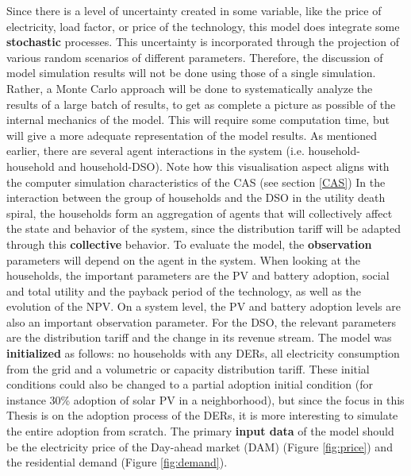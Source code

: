 \newline \newline \noindent
Since there is a level of uncertainty created in some variable, like the price of electricity, load factor, or price of the technology, this model does integrate some \textbf{stochastic} processes. This uncertainty is incorporated through the projection of various random scenarios of different parameters. Therefore, the discussion of model simulation results will not be done using those of a single simulation. Rather, a Monte Carlo approach will be done to systematically analyze the results of a large batch of results, to get as complete a picture as possible of the internal mechanics of the model. This will require some computation time, but will give a more adequate representation of the model results. As mentioned earlier, there are several agent interactions in the system (i.e. household-household and household-DSO). Note how this visualisation aspect aligns with the computer simulation characteristics of the CAS (see section \ref{CAS})
\newline \newline \noindent
In the interaction between the group of households and the DSO in the utility death spiral, the households form an aggregation of agents that will collectively affect the state and behavior of the system, since the distribution tariff will be adapted through this \textbf{collective} behavior. To evaluate the model, the \textbf{observation} parameters will depend on the agent in the system. When looking at the households, the important parameters are the PV and battery adoption, social and total utility and the payback period of the technology, as well as the evolution of the NPV. On a system level, the PV and battery adoption levels are also an important observation parameter. For the DSO, the relevant parameters are the distribution tariff and the change in its revenue stream. 
\newline \newline \noindent
The model was \textbf{initialized} as follows: no households with any DERs, all electricity consumption from the grid and a volumetric or capacity distribution tariff. These initial conditions could also be changed to a partial adoption initial condition (for instance  30\% adoption of solar PV in a neighborhood), but since the focus in this Thesis is on the adoption process of the DERs, it is more interesting to simulate the entire adoption from scratch. The primary \textbf{input data} of the model should be the electricity price of the Day-ahead market (DAM) (Figure \ref{fig:price}) and the residential demand (Figure \ref{fig:demand}). 
